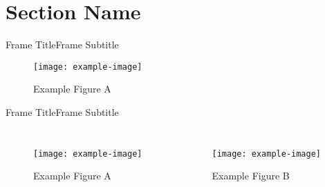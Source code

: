 \section{Section Name}
\graphicspath{{figs/section2/}} %

\begin{frame}{Frame Title}{Frame Subtitle}
    \begin{figure}
        \begin{center}
            \texttt{[image: example-image]}
            \caption{Example Figure A}
        \end{center}
    \end{figure}
\end{frame}

\begin{frame}{Frame Title}{Frame Subtitle}
    \begin{columns}
        \begin{figure}
            \begin{center}
                \texttt{[image: example-image]}
                \caption{Example Figure A}
            \end{center}
        \end{figure}
        \begin{figure}
            \begin{center}
                \texttt{[image: example-image]}
                \caption{Example Figure B}
            \end{center}
        \end{figure}
    \end{columns}
\end{frame}


